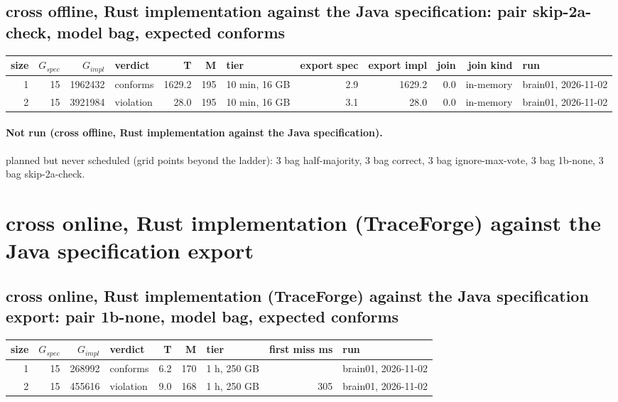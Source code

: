 \documentclass[10pt]{article}
\begin{document}
\subsection*{cross offline, Rust implementation against the Java specification: pair \textsf{skip-2a-check}, model bag, expected conforms}
\begin{longtable}{@{}rrrlrrlrrrrl@{}}
\toprule
size & $G_{\mathit{spec}}$ & $G_{\mathit{impl}}$ & verdict & T & M & tier & export spec & export impl & join & join kind & run \\
\midrule
\endhead
\color{red} 1 & 15 & 1962432 & conforms & 1629.2 & 195 & 10 min, 16 GB & 2.9 & 1629.2 & 0.0 & in-memory & brain01, 2026-11-02 \\
\color{red} 2 & 15 & 3921984 & violation & 28.0 & 195 & 10 min, 16 GB & 3.1 & 28.0 & 0.0 & in-memory & brain01, 2026-11-02 \\
\bottomrule
\end{longtable}
\paragraph{Not run (cross offline, Rust implementation against the Java specification).}
planned but never scheduled (grid points beyond the ladder): 3 bag half-majority, 3 bag correct, 3 bag ignore-max-vote, 3 bag 1b-none, 3 bag skip-2a-check.\par
\section*{cross online, Rust implementation (TraceForge) against the Java specification export}
\subsection*{cross online, Rust implementation (TraceForge) against the Java specification export: pair \textsf{1b-none}, model bag, expected conforms}
\begin{longtable}{@{}rrrlrrlrl@{}}
\toprule
size & $G_{\mathit{spec}}$ & $G_{\mathit{impl}}$ & verdict & T & M & tier & first miss ms & run \\
\midrule
\endhead
\color{red} 1 & 15 & 268992 & conforms & 6.2 & 170 & 1 h, 250 GB &  & brain01, 2026-11-02 \\
\color{red} 2 & 15 & 455616 & violation & 9.0 & 168 & 1 h, 250 GB & 305 & brain01, 2026-11-02 \\
\bottomrule
\end{longtable}
\end{document}
